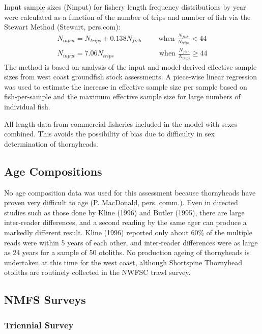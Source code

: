 \documentclass[11pt,
  english,
  letterpaper,
]{article}
\begin{document}
Input sample sizes (Ninput) for fishery length frequency distributions by year were calculated as a function of the number of trips and number of fish via the Stewart Method (Stewart, pers.com): \begin{align*}{N_{input} = N_{trips} + 0.138N_{fish}}\qquad\text{ when }\frac{N_{fish}}{N_{trips}}<44 \\
{N_{input} = 7.06N_{trips}}\qquad\qquad\qquad\text{ when }\frac{N_{fish}}{N_{trips}}\ge 44 \end{align*} The method is based on analysis of the input and model-derived effective sample sizes from west coast groundfish stock assessments. A piece-wise linear regression was used to estimate the increase in effective sample size per sample based on fish-per-sample and the maximum effective sample size for large numbers of individual fish.

All length data from commercial fisheries included in the model with sexes combined. This avoids the possibility of bias due to difficulty in sex determination of thornyheads.

\hypertarget{age-compositions}{%
\subsection{Age Compositions}\label{age-compositions}}

No age composition data was used for this assessment because thornyheads have proven very difficult to age (P. MacDonald, pers. comm.). Even in directed studies such as those done by Kline (1996) and Butler (1995), there are large inter-reader differences, and a second reading by the same ager can produce a markedly different result. Kline (1996) reported only about 60\% of the multiple reads were within 5 years of each other, and inter-reader differences were as large as 24 years for a sample of 50 otoliths. No production ageing of thornyheads is undertaken at this time for the west coast, although Shortspine Thornyhead otoliths are routinely collected in the NWFSC trawl survey.

\hypertarget{nmfs-surveys}{%
\subsection{NMFS Surveys}\label{nmfs-surveys}}

\hypertarget{triennial-survey}{%
\subsubsection{Triennial Survey}\label{triennial-survey}}
\end{document}
